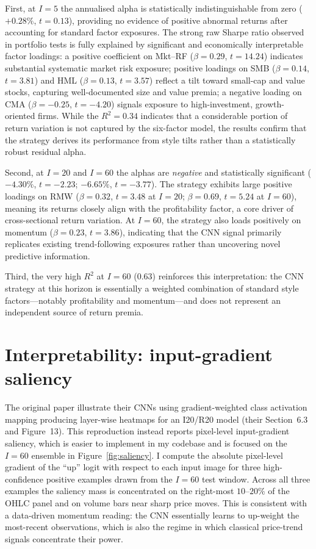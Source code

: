 \documentclass{article}
\begin{document}
First, at $I=5$ the annualised alpha is statistically indistinguishable from
zero ($+0.28\%$, $t=0.13$), providing no evidence of positive abnormal returns
after accounting for standard factor exposures. The strong raw Sharpe ratio
observed in portfolio tests is fully explained by significant and economically
interpretable factor loadings: a positive coefficient on Mkt--RF ($\beta=0.29$, $t=14.24$)
indicates substantial systematic market risk exposure; positive loadings on SMB ($\beta=0.14$, $t=3.81$)
and HML ($\beta=0.13$, $t=3.57$) reflect a tilt toward small-cap and value stocks,
capturing well-documented size and value premia; a negative loading on CMA
($\beta=-0.25$, $t=-4.20$) signals exposure to high-investment, growth-oriented firms.
While the $R^{2}=0.34$ indicates that a considerable portion of return variation
is not captured by the six-factor model, the results confirm that the strategy
derives its performance from style tilts rather than a statistically robust
residual alpha.

Second, at $I=20$ and $I=60$ the alphas are \emph{negative} and statistically
significant ($-4.30\%$, $t=-2.23$; $-6.65\%$, $t=-3.77$). The strategy exhibits
large positive loadings on RMW ($\beta=0.32$, $t=3.48$ at $I=20$; $\beta=0.69$,
$t=5.24$ at $I=60$), meaning its returns closely align with the profitability
factor, a core driver of cross-sectional return variation. At $I=60$, the
strategy also loads positively on momentum ($\beta=0.23$, $t=3.86$), indicating
that the CNN signal primarily replicates existing trend-following exposures
rather than uncovering novel predictive information.

Third, the very high $R^{2}$ at $I=60$ ($0.63$) reinforces this interpretation:
the CNN strategy at this horizon is essentially a weighted combination of
standard style factors---notably profitability and momentum---and does not
represent an independent source of return premia.

\section{Interpretability: input-gradient saliency}
\label{sec:saliency}

The original paper illustrate their CNNs using gradient-weighted class
activation mapping producing layer-wise heatmaps for an I20/R20 model (their Section~6.3 and Figure~13).
This reproduction instead reports pixel-level input-gradient saliency, which is easier to implement in my codebase and is focused on
the $I=60$ ensemble in Figure~\ref{fig:saliency}. I compute the absolute
pixel-level gradient of the ``up'' logit with respect to each input image for
three high-confidence positive examples drawn from the $I=60$ test window.
Across all three examples the saliency mass is concentrated on the right-most
$10$--$20\%$ of the OHLC panel and on volume bars near sharp price moves. This
is consistent with a data-driven momentum reading: the CNN essentially learns
to up-weight the most-recent observations, which is also the regime in which
classical price-trend signals concentrate their power.
\end{document}
